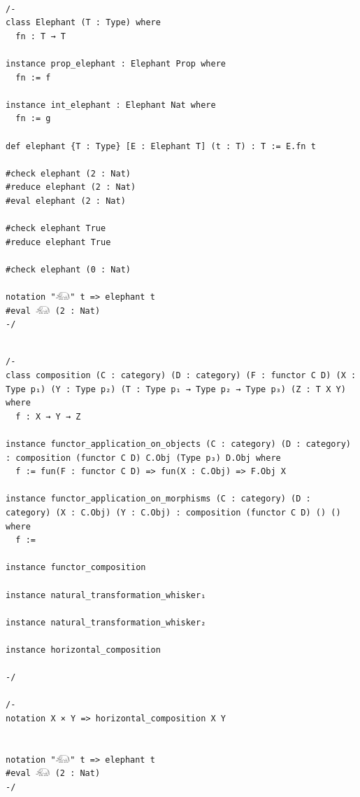 \documentclass{book}
\newcounter{lcounter}
\begin{document}
\begin{center}
\begin{tcolorbox}[width=5in,colback={white},title={\begin{center}\texttt{Lean \thelcounter} \addtocounter{lcounter}{1}  \end{center}},colbacktitle=Blue,coltitle=black]
\begin{verbatim}

/-
class Elephant (T : Type) where
  fn : T → T

instance prop_elephant : Elephant Prop where
  fn := f

instance int_elephant : Elephant Nat where
  fn := g

def elephant {T : Type} [E : Elephant T] (t : T) : T := E.fn t

#check elephant (2 : Nat)
#reduce elephant (2 : Nat)
#eval elephant (2 : Nat)

#check elephant True
#reduce elephant True

#check elephant (0 : Nat)

notation "𓃰" t => elephant t
#eval 𓃰 (2 : Nat)
-/

\end{verbatim}%
\end{tcolorbox}
\end{center}

\begin{center}
\begin{tcolorbox}[width=5in,colback={white},title={\begin{center}\texttt{Lean \thelcounter} \addtocounter{lcounter}{1}  \end{center}},colbacktitle=Blue,coltitle=black]
\begin{verbatim}

/-
class composition (C : category) (D : category) (F : functor C D) (X : Type p₁) (Y : Type p₂) (T : Type p₁ → Type p₂ → Type p₃) (Z : T X Y) where
  f : X → Y → Z

instance functor_application_on_objects (C : category) (D : category) : composition (functor C D) C.Obj (Type p₃) D.Obj where
  f := fun(F : functor C D) => fun(X : C.Obj) => F.Obj X

instance functor_application_on_morphisms (C : category) (D : category) (X : C.Obj) (Y : C.Obj) : composition (functor C D) () () where
  f := 

instance functor_composition

instance natural_transformation_whisker₁

instance natural_transformation_whisker₂

instance horizontal_composition 

-/

/-
notation X × Y => horizontal_composition X Y


notation "𓃰" t => elephant t
#eval 𓃰 (2 : Nat)
-/

\end{verbatim}%
\end{tcolorbox}
\end{center}
\end{document}

